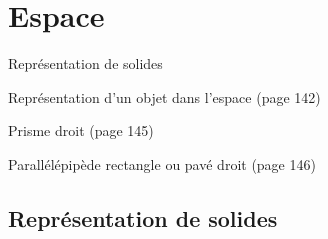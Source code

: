 \documentclass[a4paper,11pt]{report}
\begin{document}
\newcommand{\chapterName}{Espace}
\newcommand{\serieName}{Représentation de solides}


\chapter*{\chapterName}
\thispagestyle{empty}

\begin{amL}{\serieName}{
\item Représentation d’un objet dans l’espace (page 142)
\item Prisme droit (page 145)
\item Parallélépipède rectangle ou pavé droit (page 146)
}
\end{amL}
\section*{\serieName}
\setcounter{page}{1}
\thispagestyle{firstPage}
\end{document}
